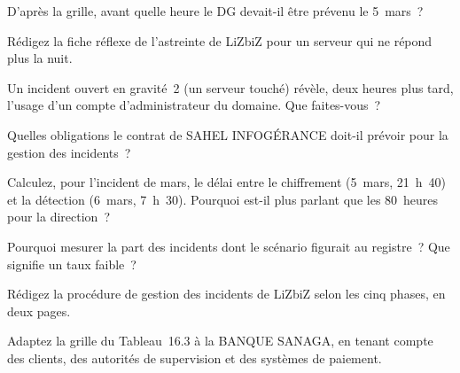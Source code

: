\begin{boxexo}[title={\ding{45}\quad Exercice~16.3. Le délai \niveaubase}]
D'après la grille, avant quelle heure le DG devait-il être prévenu le
5~mars~?
\end{boxexo}

\begin{boxexo}[title={\ding{45}\quad Exercice~16.4. L'astreinte \niveaumoyen}]
Rédigez la fiche réflexe de l'astreinte de LiZbiZ pour un serveur qui ne
répond plus la nuit.
\end{boxexo}

\begin{boxexo}[title={\ding{45}\quad Exercice~16.5. Reclasser \niveaumoyen}]
Un incident ouvert en gravité~2 (un serveur touché) révèle, deux heures
plus tard, l'usage d'un compte d'administrateur du domaine. Que faites-vous~?
\end{boxexo}

\begin{boxexo}[title={\ding{45}\quad Exercice~16.6. Le prestataire \niveaumoyen}]
Quelles obligations le contrat de SAHEL INFOGÉRANCE doit-il prévoir pour la
gestion des incidents~?
\end{boxexo}

\begin{boxexo}[title={\ding{45}\quad Exercice~16.7. Les délais \niveaumoyen}]
Calculez, pour l'incident de mars, le délai entre le chiffrement
(5~mars, 21~h~40) et la détection (6~mars, 7~h~30). Pourquoi est-il plus
parlant que les 80~heures pour la direction~?
\end{boxexo}

\begin{boxexo}[title={\ding{45}\quad Exercice~16.8. Le registre \niveaumoyen}]
Pourquoi mesurer la part des incidents dont le scénario figurait au
registre~? Que signifie un taux faible~?
\end{boxexo}

\begin{boxexo}[title={\ding{45}\quad Exercice~16.9. Une procédure \niveauexpert}]
Rédigez la procédure de gestion des incidents de LiZbiZ selon les cinq
phases, en deux pages.
\end{boxexo}

\begin{boxexo}[title={\ding{45}\quad Exercice~16.10. Une grille bancaire \niveauexpert}]
Adaptez la grille du Tableau~16.3 à la BANQUE SANAGA, en tenant compte des
clients, des autorités de supervision et des systèmes de paiement.
\end{boxexo}

